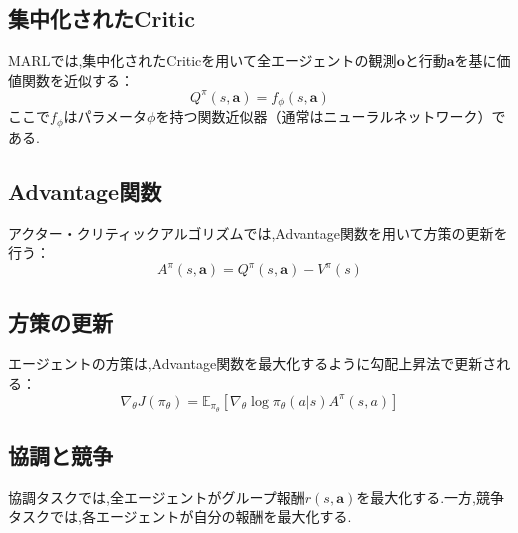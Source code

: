 \subsection*{集中化されたCritic}
MARLでは,集中化されたCriticを用いて全エージェントの観測$\boldsymbol{o}$と行動$\boldsymbol{a}$を基に価値関数を近似する：
\[
Q^\pi(s, \boldsymbol{a}) = f_\phi(s, \boldsymbol{a})
\]
ここで$f_\phi$はパラメータ$\phi$を持つ関数近似器（通常はニューラルネットワーク）である.

\subsection*{Advantage関数}
アクター・クリティックアルゴリズムでは,Advantage関数を用いて方策の更新を行う：
\[
A^\pi(s, \boldsymbol{a}) = Q^\pi(s, \boldsymbol{a}) - V^\pi(s)
\]

\subsection*{方策の更新}
エージェントの方策は,Advantage関数を最大化するように勾配上昇法で更新される：
\[
\nabla_\theta J(\pi_\theta) = \mathbb{E}_{\pi_\theta} \left[ \nabla_\theta \log \pi_\theta(a | s) A^\pi(s, a) \right]
\]

\subsection*{協調と競争}
協調タスクでは,全エージェントがグループ報酬$r(s, \boldsymbol{a})$を最大化する.一方,競争タスクでは,各エージェントが自分の報酬を最大化する.

